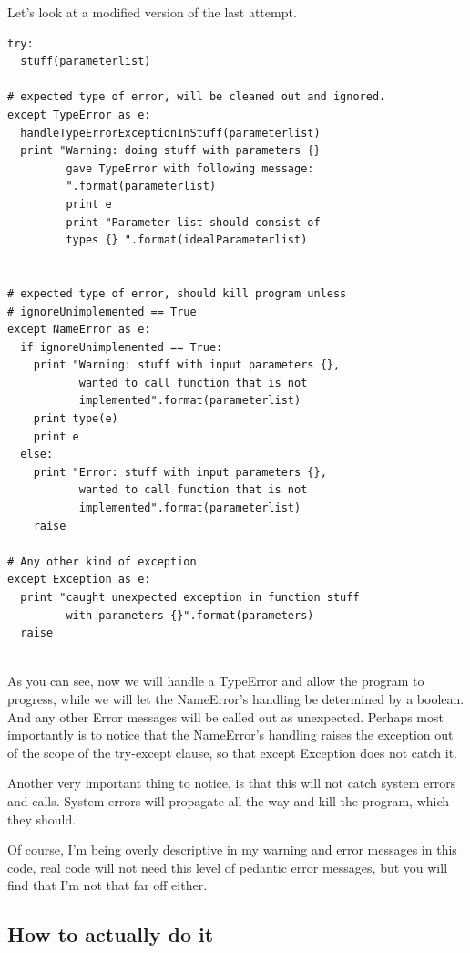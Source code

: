 \documentclass[10pt,a4paper]{article}
\begin{document}
Let's look at a modified version of the last attempt.

\begin{lstlisting}
try: 
  stuff(parameterlist)
  
# expected type of error, will be cleaned out and ignored.
except TypeError as e:
  handleTypeErrorExceptionInStuff(parameterlist)
  print "Warning: doing stuff with parameters {} 
         gave TypeError with following message:
         ".format(parameterlist)
         print e 
         print "Parameter list should consist of 
         types {} ".format(idealParameterlist)


# expected type of error, should kill program unless 
# ignoreUnimplemented == True
except NameError as e: 
  if ignoreUnimplemented == True:
    print "Warning: stuff with input parameters {}, 
           wanted to call function that is not 
           implemented".format(parameterlist)
    print type(e)
    print e
  else:
    print "Error: stuff with input parameters {}, 
           wanted to call function that is not 
           implemented".format(parameterlist)  
    raise

# Any other kind of exception
except Exception as e:
  print "caught unexpected exception in function stuff
         with parameters {}".format(parameters)
  raise
  
\end{lstlisting}

As you can see, now we will handle a TypeError and allow the program to progress, while we will let the NameError's handling be determined by a boolean. And any other Error messages will be called out as unexpected. Perhaps most importantly is to notice that the NameError's handling raises the exception out of the scope of the try-except clause, so that except Exception does not catch it.

Another very important thing to notice, is that this will not catch system errors and calls. System errors will propagate all the way and kill the program, which they should. 

Of course, I'm being overly descriptive in my warning and error messages in this code, real code will not need this level of pedantic error messages, but you will find that I'm not that far off either. 

\subsection{How to actually do it}
\end{document}
